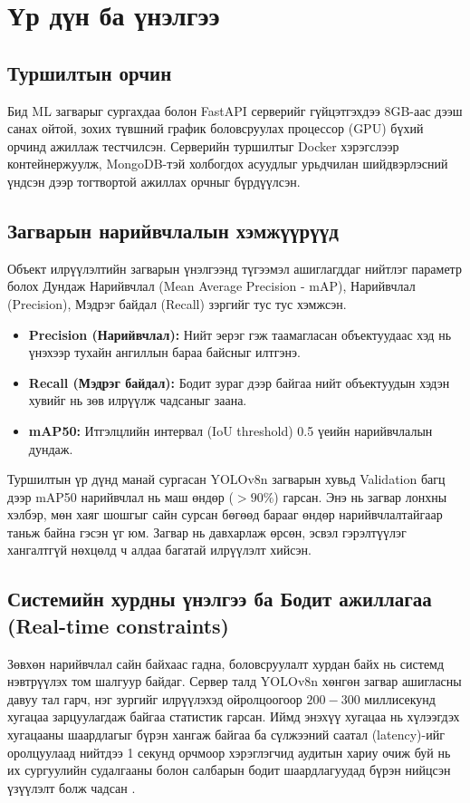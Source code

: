 \chapter{Үр дүн ба үнэлгээ}

\section{Туршилтын орчин}
Бид ML загварыг сургахдаа болон FastAPI серверийг гүйцэтгэхдээ 8GB-аас дээш санах ойтой, зохих түвшний график боловсруулах процессор (GPU) бүхий орчинд ажиллаж тестчилсэн. Серверийн туршилтыг Docker хэрэгслээр контейнержуулж, MongoDB-тэй холбогдох асуудлыг урьдчилан шийдвэрлэсний үндсэн дээр тогтвортой ажиллах орчныг бүрдүүлсэн.

\section{Загварын нарийвчлалын хэмжүүрүүд}
Объект илрүүлэлтийн загварын үнэлгээнд түгээмэл ашиглагддаг нийтлэг параметр болох Дундаж Нарийвчлал (Mean Average Precision - mAP), Нарийвчлал (Precision), Мэдрэг байдал (Recall) зэргийг тус тус хэмжсэн.
\begin{itemize}
    \item \textbf{Precision (Нарийвчлал):} Нийт эерэг гэж таамагласан объектуудаас хэд нь үнэхээр тухайн ангиллын бараа байсныг илтгэнэ.
    \item \textbf{Recall (Мэдрэг байдал):} Бодит зураг дээр байгаа нийт объектуудын хэдэн хувийг нь зөв илрүүлж чадсаныг заана.
    \item \textbf{mAP50:} Итгэлцлийн интервал (IoU threshold) 0.5 үеийн нарийвчлалын дундаж.
\end{itemize}

Туршилтын үр дүнд манай сургасан YOLOv8n загварын хувьд Validation багц дээр mAP50 нарийвчлал нь маш өндөр ($>90\%$) гарсан. Энэ нь загвар лонхны хэлбэр, мөн хаяг шошгыг сайн сурсан бөгөөд барааг өндөр нарийвчлалтайгаар таньж байна гэсэн үг юм. Загвар нь давхарлаж өрсөн, эсвэл гэрэлтүүлэг хангалтгүй нөхцөлд ч алдаа багатай илрүүлэлт хийсэн.

\section{Системийн хурдны үнэлгээ ба Бодит ажиллагаа (Real-time constraints)}
Зөвхөн нарийвчлал сайн байхаас гадна, боловсруулалт хурдан байх нь системд нэвтрүүлэх том шалгуур байдаг. Сервер талд YOLOv8n хөнгөн загвар ашигласны давуу тал гарч, нэг зургийг илрүүлэхэд ойролцоогоор $200-300$ миллисекунд хугацаа зарцуулагдаж байгаа статистик гарсан. 
Иймд энэхүү хугацаа нь хүлээгдэх хугацааны шаардлагыг бүрэн хангаж байгаа ба сүлжээний саатал (latency)-ийг оролцуулаад нийтдээ 1 секунд орчмоор хэрэглэгчид аудитын хариу очиж буй нь их сургуулийн судалгааны болон салбарын бодит шаардлагуудад бүрэн нийцсэн үзүүлэлт болж чадсан \cite{yolov8_ultralytics}.
